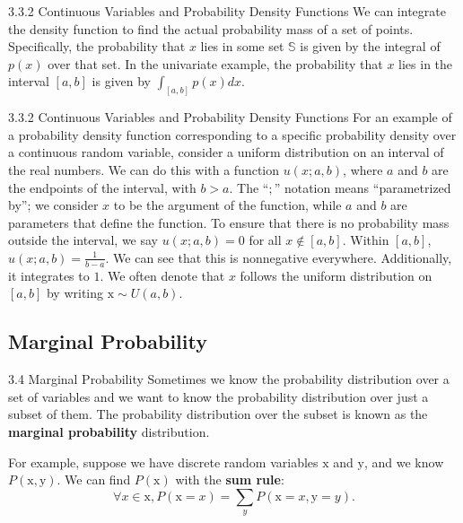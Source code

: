 \begin{frame}{3.3.2 Continuous Variables and Probability Density Functions}
    \justifying
    We can integrate the density function to find the actual probability mass of a set of points. Specifically, the probability that $x$ lies in some set $\mathbb{S}$ is given by the integral of $p(x)$ over that set. In the univariate example, the probability that $x$ lies in the interval $[a, b]$ is given by $\int_{[a, b]}p(x)dx$.
\end{frame}

\begin{frame}{3.3.2 Continuous Variables and Probability Density Functions}
    \justifying
    For an example of a probability density function corresponding to a specific probability density over a continuous random variable, consider a uniform distribution on an interval of the real numbers. We can do this with a function $u(x; a, b)$, where $a$ and $b$ are the endpoints of the interval, with $b > a$. The ``$;$'' notation means ``parametrized by''; we consider $x$ to be the argument of the function, while $a$ and $b$ are parameters that define the function. To ensure that there is no probability mass outside the interval, we say $u(x; a, b) = 0$ for all $x \notin [a, b]$. Within $[a, b]$, $u(x; a, b) = \frac{1}{b - a}$. We can see that this is nonnegative everywhere. Additionally, it integrates to $1$. We often denote that $x$ follows the uniform distribution on $[a, b]$ by writing $\mathrm{x} \sim U(a, b)$.
\end{frame}

\subsection{Marginal Probability}
\begin{frame}{3.4 Marginal Probability}
    \justifying
    Sometimes we know the probability distribution over a set of variables and we want to know the probability distribution over just a subset of them. The probability distribution over the subset is known as the \textbf{marginal probability} distribution.
    
    For example, suppose we have discrete random variables $\mathrm{x}$ and $\mathrm{y}$, and we know $P(\mathrm{x}, \mathrm{y})$. We can find $P(\mathrm{x})$ with the \textbf{sum rule}:
    \begin{equation}
        \forall x \in \mathrm{x}, P(\mathrm{x} = x) = \sum_{y}P(\mathrm{x} = x, \mathrm{y} = y).
        \label{eq:3_3}
    \end{equation}
\end{frame}

